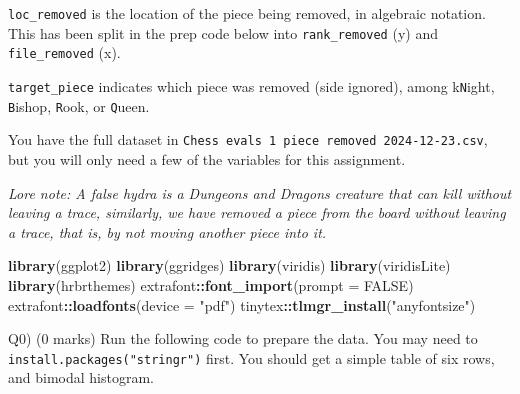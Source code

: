 \documentclass[
]{article}
\newenvironment{Shaded}{\begin{snugshade}}{\end{snugshade}}
\newcommand{\AttributeTok}[1]{\textcolor[rgb]{0.13,0.29,0.53}{#1}}
\newcommand{\ConstantTok}[1]{\textcolor[rgb]{0.56,0.35,0.01}{#1}}
\newcommand{\FunctionTok}[1]{\textcolor[rgb]{0.13,0.29,0.53}{\textbf{#1}}}
\newcommand{\NormalTok}[1]{#1}
\newcommand{\SpecialCharTok}[1]{\textcolor[rgb]{0.81,0.36,0.00}{\textbf{#1}}}
\newcommand{\StringTok}[1]{\textcolor[rgb]{0.31,0.60,0.02}{#1}}
\begin{document}
\texttt{loc\_removed} is the location of the piece being removed, in
algebraic notation. This has been split in the prep code below into
\texttt{rank\_removed} (y) and \texttt{file\_removed} (x).

\texttt{target\_piece} indicates which piece was removed (side ignored),
among k\texttt{N}ight, \texttt{B}ishop, \texttt{R}ook, or
\texttt{Q}ueen.

You have the full dataset in
\texttt{Chess\ evals\ 1\ piece\ removed\ 2024-12-23.csv}, but you will
only need a few of the variables for this assignment.

\emph{Lore note: A false hydra is a Dungeons and Dragons creature that
can kill without leaving a trace, similarly, we have removed a piece
from the board without leaving a trace, that is, by not moving another
piece into it.}

\begin{Shaded}
\begin{Highlighting}[]
\FunctionTok{library}\NormalTok{(ggplot2)}
\FunctionTok{library}\NormalTok{(ggridges)}
\FunctionTok{library}\NormalTok{(viridis)}
\FunctionTok{library}\NormalTok{(viridisLite)}
\FunctionTok{library}\NormalTok{(hrbrthemes)}
\NormalTok{extrafont}\SpecialCharTok{::}\FunctionTok{font\_import}\NormalTok{(}\AttributeTok{prompt =} \ConstantTok{FALSE}\NormalTok{)}
\NormalTok{extrafont}\SpecialCharTok{::}\FunctionTok{loadfonts}\NormalTok{(}\AttributeTok{device =} \StringTok{"pdf"}\NormalTok{)}
\NormalTok{tinytex}\SpecialCharTok{::}\FunctionTok{tlmgr\_install}\NormalTok{(}\StringTok{"anyfontsize"}\NormalTok{)}
\end{Highlighting}
\end{Shaded}

Q0) (0 marks) Run the following code to prepare the data. You may need
to \texttt{install.packages("stringr")} first. You should get a simple
table of six rows, and bimodal histogram.
\end{document}
